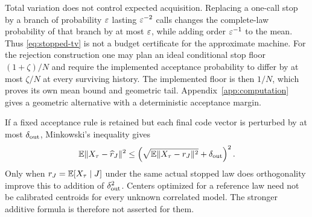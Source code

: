 \begin{remark}\label{rem:mean-not-tv}
Total variation does not control expected acquisition. Replacing a one-call stop by a branch of probability $\varepsilon$ lasting $\varepsilon^{-2}$ calls changes the complete-law probability of that branch by at most $\varepsilon$, while adding order $\varepsilon^{-1}$ to the mean. Thus \eqref{eq:stopped-tv} is not a budget certificate for the approximate machine. For the rejection construction one may plan an ideal conditional stop floor $(1+\zeta)/N$ and require the implemented acceptance probability to differ by at most $\zeta/N$ at every surviving history. The implemented floor is then $1/N$, which proves its own mean bound and geometric tail. Appendix~\ref{app:computation} gives a geometric alternative with a deterministic acceptance margin.
\end{remark}

If a fixed acceptance rule is retained but each final code vector is perturbed by at most $\delta_{\rm out}$, Minkowski's inequality gives
\begin{equation}\label{eq:root-error}
 \mathbb E\lVert X_\tau-\widehat r_J\rVert^2
   \le\left(\sqrt{\mathbb E\lVert X_\tau-r_J\rVert^2}+\delta_{\rm out}\right)^2.
\end{equation}
Only when $r_J=\mathbb E[X_\tau\mid J]$ under the same actual stopped law does orthogonality improve this to addition of $\delta_{\rm out}^2$. Centers optimized for a reference law need not be calibrated centroids for every unknown correlated model. The stronger additive formula is therefore not asserted for them.


